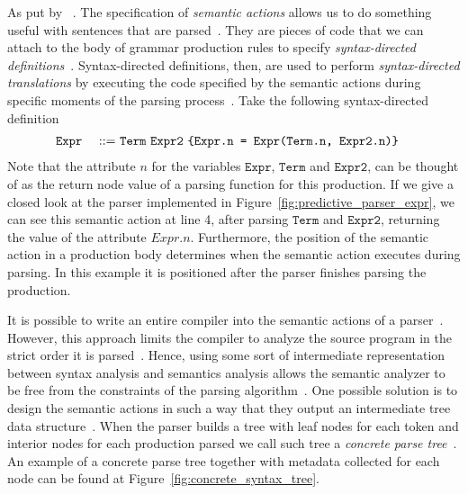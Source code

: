 \documentclass[
  oneside,
  english,
  coorientadorbanca,
  noabntexcite
]{ufsc-thesis-rn46-2019}
\def\bnfdef{::=}
\newcommand{\code}[1]{\texttt{#1}}
\newcommand{\bnfvar}[1]{\ \bnfvars{#1}}
\newcommand{\bnfvars}[1]{\code{#1}}
\newcommand{\bnfprod}[2]{\bnfvars{#1} &\ &\bnfdef& #2}
\begin{document}
As put by~\textcite{appel2003modern} .
The specification of \textit{semantic actions} allows us to do something useful with sentences that are parsed~\cite{appel2003modern}.
They are pieces of code that we can attach to the body of grammar production rules to specify \textit{syntax-directed definitions}~\cite{Aho:2006:CPT:1177220}.
Syntax-directed definitions, then, are used to perform \textit{syntax-directed translations} by executing the code specified by the semantic actions during specific moments of the parsing process~\cite{Aho:2006:CPT:1177220}.
Take the following syntax-directed definition
\begin{alignat}{2}
  \bnfprod{Expr}{\bnfvar{Term} \bnfvar{Expr2}\ \text{\code{\{Expr.n = Expr(Term.n, Expr2.n)\}}}} \label{eq:sdd_example}
\end{alignat}
Note that the attribute $n$ for the variables $\bnfvars{Expr}$, $\bnfvars{Term}$ and $\bnfvars{Expr2}$, can be thought of as the return node value of a parsing function for this production.
If we give a closed look at the parser implemented in Figure~\ref{fig:predictive_parser_expr}, we can see this semantic action at line 4, after parsing $\bnfvars{Term}$ and $\bnfvars{Expr2}$, returning the value of the attribute $Expr.n$.
Furthermore, the position of the semantic action in a production body determines when the semantic action executes during parsing.
In this example it is positioned after the parser finishes parsing the production.

It is possible to write an entire compiler into the semantic actions of a parser~\cite{appel2003modern}.
However, this approach limits the compiler to analyze the source program in the strict order it is parsed~\cite{appel2003modern}.
Hence, using some sort of intermediate representation between syntax analysis and semantics analysis allows the semantic analyzer to be free from the constraints of the parsing algorithm~\cite{appel2003modern}.
One possible solution is to design the semantic actions in such a way that they output an intermediate tree data structure~\cite{appel2003modern}.
When the parser builds a tree with leaf nodes for each token and interior nodes for each production parsed we call such tree a \textit{concrete parse tree}~\cite{appel2003modern}.
An example of a concrete parse tree together with metadata collected for each node can be found at Figure~\ref{fig:concrete_syntax_tree}.
\end{document}
